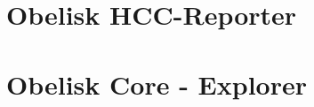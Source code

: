 \begin{appendices}
\section{Obelisk HCC-Reporter}
\label{appendix:obelisk_hcc_reporter}

\begin{figure}[htp]
\end{figure}
\newpage

\section{Obelisk Core - Explorer}
\label{appendix:obelisk_explorer}


\end{appendices}
